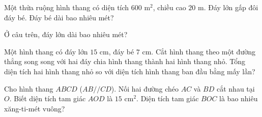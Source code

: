 \begin{ex}
  Một thửa ruộng hình thang có diện tích $600\text{ m}^2$, chiều cao $20\text{ m}$. Đáy lớn gấp đôi đáy bé. Đáy bé dài bao nhiêu mét?
\end{ex}

\begin{ex}
  Ở câu trên, đáy lớn dài bao nhiêu mét?
\end{ex}

\begin{ex}
  Một hình thang có đáy lớn $15\text{ cm}$, đáy bé $7\text{ cm}$. Cắt hình thang theo một đường thẳng song song với hai đáy chia hình thang thành hai hình thang nhỏ. Tổng diện tích hai hình thang nhỏ so với diện tích hình thang ban đầu bằng mấy lần?
\end{ex}

\begin{ex}
  Cho hình thang $ABCD$ ($AB // CD$). Nối hai đường chéo $AC$ và $BD$ cắt nhau tại $O$. Biết diện tích tam giác $AOD$ là $15\text{ cm}^2$. Diện tích tam giác $BOC$ là bao nhiêu xăng-ti-mét vuông?
\end{ex}
